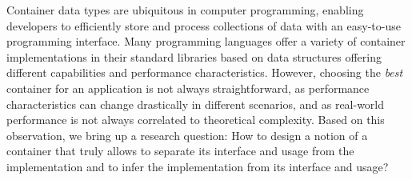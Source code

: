 Container data types are ubiquitous in computer programming, enabling developers to efficiently store and process collections of data with an easy-to-use programming interface.
Many programming languages offer a variety of container implementations in their standard libraries based on data structures offering different capabilities and performance characteristics.
However, choosing the \emph{best} container for an application is not always straightforward, as performance characteristics can change drastically in different scenarios, and as real-world performance is not always correlated to theoretical complexity. Based on this observation, we bring up a research question: How to design a notion of a container that truly allows to separate its interface and usage from the implementation and to infer the implementation from its interface and usage?

